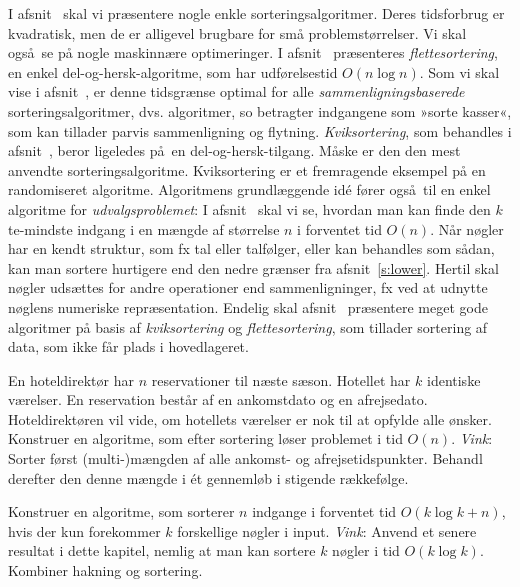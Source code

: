 I afsnit~ skal vi præsentere nogle enkle sorteringsalgoritmer.
Deres tidsforbrug er kvadratisk, men de er alligevel brugbare for små problemstørrelser.
Vi skal også se på nogle maskinnære optimeringer.
I afsnit~ præsenteres \emph{flettesortering}, en enkel del-og-hersk-algoritme, som har udførelsestid $O(n\log n)$.
Som vi skal vise i afsnit~, er denne tidsgrænse optimal for alle \emph{sammenligningsbaserede} sorteringsalgoritmer, dvs. algoritmer, so betragter indgangene som »sorte kasser«, som kan tillader parvis sammenligning og flytning.
\emph{Kviksortering}, som behandles i  afsnit~, beror ligeledes på en del-og-hersk-tilgang.
Måske er den den mest anvendte sorteringsalgoritme.
Kviksortering er et fremragende eksempel på en randomiseret algoritme.
Algoritmens grundlæggende idé fører også til en enkel algoritme for \emph{udvalgsproblemet}:
I afsnit~ skal vi se, hvordan man kan finde den $k$te-mindste indgang i en mængde af størrelse $n$ i forventet tid $O(n)$.
Når nøgler har en kendt struktur, som fx tal eller talfølger, eller kan behandles som sådan, kan man sortere hurtigere end den nedre grænser fra afsnit~\ref{s:lower}.
Hertil skal nøgler udsættes for andre operationer end sammenligninger, fx ved at udnytte nøglens numeriske repræsentation.
Endelig skal afsnit~ præsentere meget gode algoritmer på basis af \emph{kviksortering} og \emph{flettesortering}, som tillader sortering af data, som ikke får plads i hovedlageret.

\begin{exerc}
  En hoteldirektør har $n$ reservationer til næste sæson.
  Hotellet har $k$ identiske værelser.
  En reservation består af en ankomstdato og en afrejsedato.
  Hoteldirektøren vil vide, om hotellets værelser er nok til at opfylde alle ønsker.
  Konstruer en algoritme, som efter sortering løser problemet i tid $O(n)$.
  \emph{Vink}: 
  Sorter først (multi-)mængden af alle ankomst- og afrejsetidspunkter.
  Behandl derefter den denne mængde i ét gennemløb i stigende rækkefølge.
\end{exerc}


\begin{exerc}
  Konstruer en algoritme, som sorterer $n$ indgange i forventet tid $O(k\log k + n)$, hvis der kun forekommer $k$ forskellige nøgler i input.
  \emph{Vink}: 
  Anvend et senere resultat i dette kapitel, nemlig at man kan sortere $k$ nøgler i tid $O(k\log k)$. 
  Kombiner hakning og sortering.
\end{exerc}


